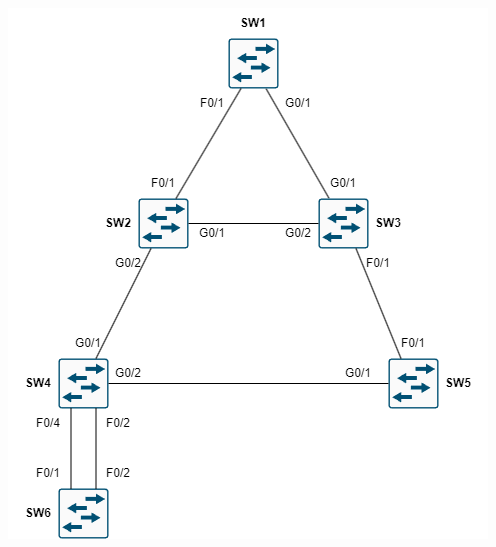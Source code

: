 \documentclass[a4paper]{book}
\begin{document}
\begin{minipage}{0.4\textwidth}
    \centering
    \includegraphics[width=\linewidth]{img/stp03.png}
\end{minipage}%
\hfill
\end{document}
